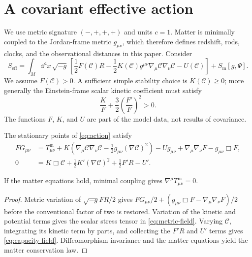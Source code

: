 \documentclass[11pt]{article}
\newcommand{\CC}{\mathcal C}
\begin{document}
\section{A covariant effective action}

We use metric signature $(-,+,+,+)$ and units $c=1$.  Matter is minimally
coupled to the Jordan-frame metric $g_{\mu\nu}$, which therefore defines
redshift, rods, clocks, and the observational distances in this paper.
Consider
\begin{equation}
 S_{\mathrm{eff}}
 =
 \int_M \dd^4x\,\sqrt{-g}\,
 \left[
 \frac{1}{2}F(\CC)R
 -\frac{1}{2}K(\CC)
    g^{\mu\nu}\nabla_\mu\CC\nabla_\nu\CC
 -U(\CC)
 \right]
 +S_{\mathrm m}[g,\Psi].
 \label{eq:action}
\end{equation}
We assume $F(\CC)>0$.  A sufficient simple stability choice is
$K(\CC)\geq 0$; more generally the Einstein-frame scalar kinetic
coefficient must satisfy
\[
 \frac{K}{F}+\frac{3}{2}\left(\frac{F'}{F}\right)^2>0.
\]
The functions $F$, $K$, and $U$ are part of the model data, not results
of covariance.

\begin{theorem}
\label{thm:field-equations}
The stationary points of \cref{eq:action} satisfy
\begin{align}
 F G_{\mu\nu}
 &=
 T^{\mathrm m}_{\mu\nu}
 +K\left(
     \nabla_\mu\CC\nabla_\nu\CC
     -\frac{1}{2}g_{\mu\nu}(\nabla\CC)^2
   \right)
 -Ug_{\mu\nu}
 +\nabla_\mu\nabla_\nu F
 -g_{\mu\nu}\Box F,
 \label{eq:metric-field}\\
 0
 &=
 K\Box\CC
 +\frac{1}{2}K'(\nabla\CC)^2
 +\frac{1}{2}F'R
 -U'.
 \label{eq:capacity-field}
\end{align}
\par\medskip\noindent
If the matter equations hold, minimal coupling gives
$\nabla^\mu T^{\mathrm m}_{\mu\nu}=0$.
\end{theorem}

\begin{proof}
Metric variation of $\sqrt{-g}F R/2$ gives
$F G_{\mu\nu}/2+(g_{\mu\nu}\Box F-\nabla_\mu\nabla_\nu F)/2$
before the conventional factor of two is restored.  Variation of the
kinetic and potential terms gives the scalar stress tensor in
\cref{eq:metric-field}.  Varying $\CC$, integrating its kinetic term by
parts, and collecting the $F'R$ and $U'$ terms gives
\cref{eq:capacity-field}.  Diffeomorphism invariance and the matter
equations yield the matter conservation law.
\end{proof}
\end{document}
